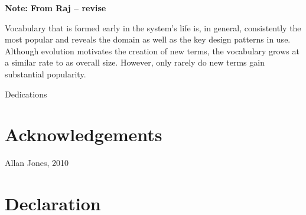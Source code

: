 \textbf{Note: From Raj -- revise}

Vocabulary that is formed early in the system's life is, in general, consistently the most popular and reveals the domain as well as the key design patterns in use. Although evolution motivates the creation of new terms, the vocabulary grows at a similar rate to as overall size. However, only rarely do new terms gain substantial popularity.

\newpage \vspace*{8cm} 
\begin{center}
	\large Dedications
\end{center}
\newpage

\chapter*{Acknowledgements}
\vspace{-0.5cm}

\vspace*{4cm}
Allan Jones, 2010

\chapter*{Declaration}
\vspace{-0.5cm}

\singlespacing

\tableofcontents \listoffigures \listoftables 
\newpage
